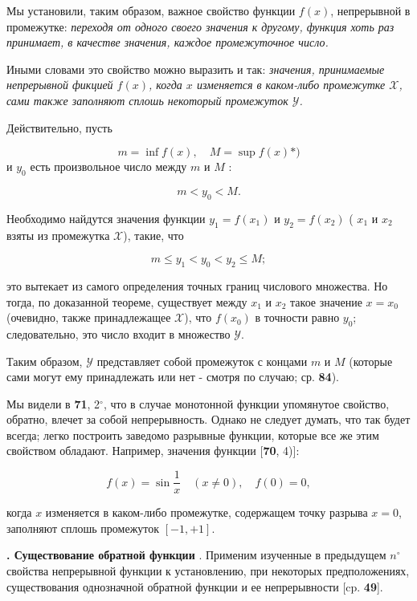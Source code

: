 \documentclass[10pt, twoside]{article}
\newcounter{subtopic}
\newcommand{\subtopic}[1]{%
  \stepcounter{subtopic}%
  \gdef\thesubtopic{\arabic{subtopic}}
  \textbf{\arabic{subtopic}. #1}
}
\begin{document}
\setcounter{page}{172}
\setcounter{subtopic}{82}
Мы установили, таким образом, важное свойство функции $f(x)$, непрерывной в промежутке: \textit{переходя от одного своего значения к другому, функция хоть раз принимает, в качестве значения, каждое промежуточное число.}

Иными словами это свойство можно выразить и так: \textit{значения, принимаемые непрерывной фикцией $f(x)$, когда $x$ изменяется в каком-либо промежутке $\mathscr{X}$, сами также заполняют сплошь некоторый промежуток $\mathscr{Y}$.}

Действительно, пусть

$$
  m=\inf f(x), \quad M=\sup f(x)*)
$$
и $y_{0}$ есть произвольное число между $m$ и $M$ :

$$
  m<y_{0}<M .
$$

Необходимо найдутся значения функции $y_{1}=f\left(x_{1}\right)$ и $y_{2}=f\left(x_{2}\right)$ ( $x_{1}$ и $x_{2}$ взяты из промежутка $\mathscr{X}$), такие, что

$$
  m \leqslant y_{1}<y_{0}<y_{2} \leqslant M ;
$$

это вытекает из самого определения точных границ числового множества. Но тогда, по доказанной теореме, существует между $x_{1}$ и $x_{2}$ такое значение $x=x_{0}$ (очевидно, также принадлежащее $\mathscr{X}$), что $f\left(x_{0}\right)$ в точности равно $y_{0}$; следовательно, это число входит в множество $\mathscr{Y}$.

Таким образом, $\mathscr{Y}$ представляет собой промежуток с концами $m$ и $M$ (которые сами могут ему принадлежать или нет - смотря по случаю; ср. \textbf{84}).

Мы видели в \textbf{71}, 2${}^{\circ}$, что в случае монотонной функции упомянутое свойство, обратно, влечет за собой непрерывность. Однако не следует думать, что так будет всегда; легко построить заведомо разрывные функции, которые все же этим свойством обладают. Например, значения функции [\textbf{70}, 4)]:

$$
  f(x)=\sin \frac{1}{x} \quad(x \neq 0), \quad f(0)=0,
$$

когда $x$ изменяется в каком-либо промежутке, содержащем точку разрыва $x=0$, заполняют сплошь промежуток $[-1,+1]$.

\subtopic{Существование обратной функции}. Применим изученные в предыдущем $n^{\circ}$ свойства непрерывной функции к установлению, при некоторых предположениях, существования однозначной обратной функции и ее непрерывности [cp. \textbf{49}].
\end{document}
